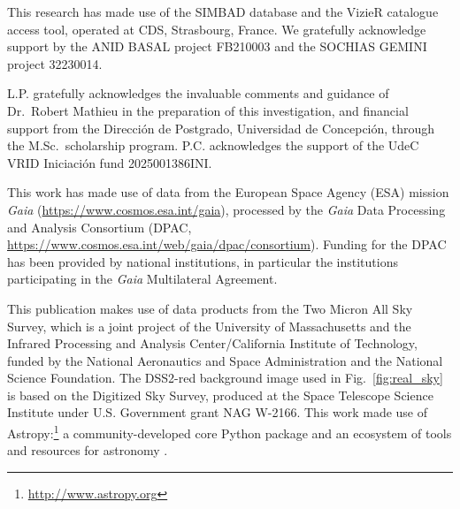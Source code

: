 \documentclass{aa}
\begin{document}
\begin{acknowledgements}
This research has made use of the SIMBAD database and the VizieR catalogue access tool, operated at CDS, Strasbourg, France. We gratefully acknowledge support by the ANID BASAL project FB210003 and the SOCHIAS GEMINI project 32230014.

L.P. gratefully acknowledges the invaluable comments and guidance of Dr.\ Robert Mathieu in the preparation of this investigation, and financial support from the Dirección de Postgrado, Universidad de Concepción, through the M.Sc.\ scholarship program. P.C. acknowledges the support of the UdeC VRID Iniciación fund 2025001386INI\@.

This work has made use of data from the European Space Agency (ESA) mission \textit{Gaia} (\url{https://www.cosmos.esa.int/gaia}), processed by the \textit{Gaia} Data Processing and Analysis Consortium (DPAC, \url{https://www.cosmos.esa.int/web/gaia/dpac/consortium}). Funding for the DPAC has been provided by national institutions, in particular the institutions participating in the \textit{Gaia} Multilateral Agreement. 

This publication makes use of data products from the Two Micron All Sky Survey, which is a joint project of the University of Massachusetts and the Infrared Processing and Analysis Center/California Institute of Technology, funded by the National Aeronautics and Space Administration and the National Science Foundation. The DSS2-red background image used in Fig.~\ref{fig:real_sky} is based on the Digitized Sky Survey, produced at the Space Telescope Science Institute under U.S. Government grant NAG W-2166. This work made use of Astropy:\footnote{\url{http://www.astropy.org}} a community-developed core Python package and an ecosystem of tools and resources for astronomy \citep{astropy:2013, astropy:2018, astropy:2022}.
\end{acknowledgements}


 
\end{document}
